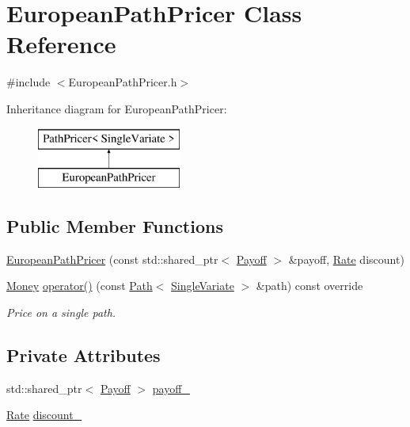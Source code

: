 \hypertarget{class_european_path_pricer}{}\section{European\+Path\+Pricer Class Reference}
\label{class_european_path_pricer}


{\ttfamily \#include $<$European\+Path\+Pricer.\+h$>$}

Inheritance diagram for European\+Path\+Pricer\+:\begin{figure}[H]
\begin{center}
\leavevmode
\includegraphics[height=2.000000cm]{class_european_path_pricer}
\end{center}
\end{figure}
\subsection*{Public Member Functions}
\begin{DoxyCompactItemize}
\item 
\hyperlink{class_european_path_pricer_aa571bb1652a0d7e4f97d3d58e7c8b295}{European\+Path\+Pricer} (const std\+::shared\+\_\+ptr$<$ \hyperlink{class_payoff}{Payoff} $>$ \&payoff, \hyperlink{_name_def_8h_a25bee43a162de339c81f3d1caf6b887d}{Rate} discount)
\item 
\hyperlink{_name_def_8h_a5a9d48c16a694e9a2d9f1eca730dc8c5}{Money} \hyperlink{class_european_path_pricer_a879d161eeff532f1f3e2fc5224b3361b}{operator()} (const \hyperlink{class_path}{Path}$<$ \hyperlink{struct_single_variate}{Single\+Variate} $>$ \&path) const override
\begin{DoxyCompactList}\small\item\em Price on a single path. \end{DoxyCompactList}\end{DoxyCompactItemize}
\subsection*{Private Attributes}
\begin{DoxyCompactItemize}
\item 
std\+::shared\+\_\+ptr$<$ \hyperlink{class_payoff}{Payoff} $>$ \hyperlink{class_european_path_pricer_a2023ec56bae32c6db123e8d400d2b0cf}{payoff\+\_\+}
\item 
\hyperlink{_name_def_8h_a25bee43a162de339c81f3d1caf6b887d}{Rate} \hyperlink{class_european_path_pricer_a1bb1874fe4f263bff17a998f0ec9588c}{discount\+\_\+}
\end{DoxyCompactItemize}


